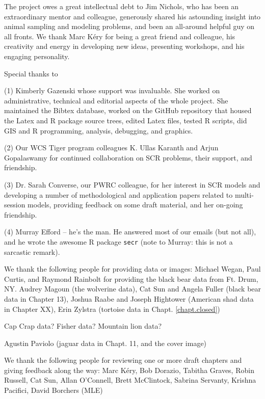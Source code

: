 
The project owes a great intellectual debt to Jim Nichols, who has
been an extraordinary mentor and colleague, generously shared his
astounding insight into animal sampling and modeling problems, and
been an all-around helpful guy on all fronts.  We thank Marc K\'{e}ry
for being a great friend and colleague, his creativity and energy in
developing new ideas, presenting workshops, and his engaging
personality.

Special thanks to

(1) Kimberly Gazenski whose support was invaluable. She worked on
administrative, technical and editorial aspects of the whole
project. She maintained the Bibtex database, worked on the GitHub
repository that housed the Latex and R package source trees, edited
Latex files, tested R scripts, did GIS and R programming, analysis,
debugging,  and graphics.

(2) Our WCS Tiger program colleagues K. Ullas Karanth and Arjun
Gopalaswamy for continued collaboration on SCR problems, their
support, and friendship.

(3) Dr. Sarah Converse, our PWRC colleague, for her interest in SCR
models and developing a number of methodological and application
papers related to multi-session models, providing feedback on some
draft material, and her on-going friendship.

(4) Murray Efford -- he's the man. He answered most of our emails (but not
all), and he wrote the awesome R package \mbox{\tt secr} (note to Murray: this
is not a sarcastic remark).


We thank the following people for providing data or images:
Michael Wegan, Paul Curtis, and Raymond Rainbolt for providing the black bear data from Ft. Drum, NY. 
Audrey Magoun (the wolverine data), 
Cat Sun and Angela Fuller (black bear data in Chapter 13),
Joshua Raabe and Joseph Hightower (American shad data in Chapter XX),
Erin Zylstra (tortoise data in Chapt. \ref{chapt.closed})

Cap Crap data? Fisher data?  Mountain lion data?

Agustin Paviolo (jaguar data in Chapt. 11, and the cover image)

We thank the following people for reviewing one or more draft chapters
and giving feedback along the way:
Marc K\'{e}ry, 
Bob Dorazio,
Tabitha Graves,
Robin Russell,
Cat Sun,
Allan O'Connell,
Brett McClintock,
Sabrina Servanty,
Krishna Pacifici,
David Borchers (MLE)
